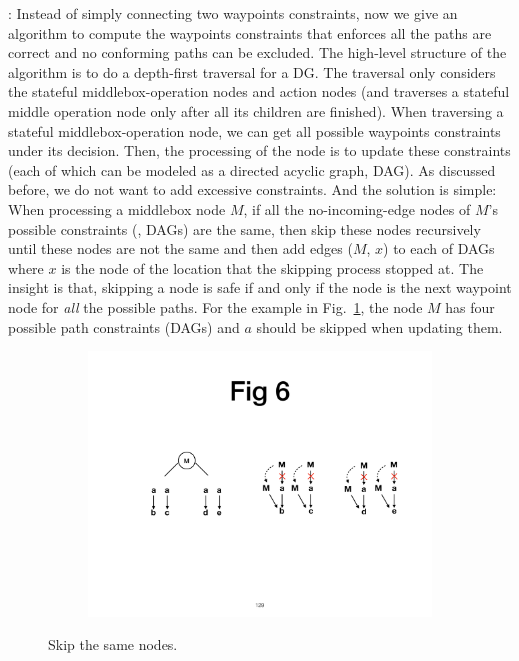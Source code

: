 : Instead of simply connecting two waypoints constraints, now we give an algorithm to compute the waypoints constraints that enforces all the paths are correct and no conforming paths can be excluded. The high-level structure of the algorithm is to do a depth-first traversal for a DG. The traversal only considers the stateful middlebox-operation nodes and action nodes (and traverses a stateful middle operation node only after all its children are finished). When traversing a stateful middlebox-operation node, we can get all possible waypoints constraints under its decision. Then, the processing of the node is to update these constraints (each of which can be modeled as a directed acyclic graph, DAG). As discussed before, we do not want to add excessive constraints. And the solution is simple: When processing a middlebox node $M$, if all the no-incoming-edge nodes of $M$'s possible constraints (\ie, DAGs) are the same, then skip these nodes recursively until these nodes are not the same and then add edges ($M$, $x$) to each of DAGs where $x$ is the node of the location that the skipping process stopped at. The insight is that, skipping a node is safe if and only if the node is the next waypoint node for \emph{all} the possible paths. For the example in Fig.~\ref{fig:skip}, the node $M$ has four possible path constraints (DAGs) and $a$ should be skipped when updating them.

\begin{figure}[!htbp]
\centering
\begin{subfigure}{0.8\linewidth}
      \centering\includegraphics[width=\linewidth]{figures/ss-129.pdf}
\end{subfigure}
\vspace{-2mm}
\caption{\small Skip the same nodes.}
\label{fig:skip}
\end{figure}



